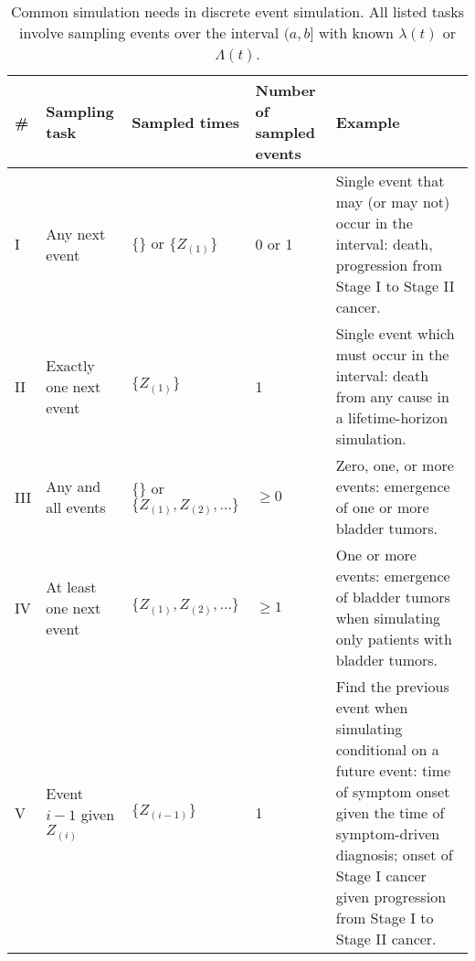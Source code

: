 \begin{table}[ht!]
    \centering
    \begin{tabular}{lp{2cm}lp{1.8cm}p{6cm}}
    \toprule
    \textbf{\#} & \textbf{Sampling task} & \textbf{Sampled times} & \textbf{Number of sampled events} & \textbf{Example}  \\ 
    \midrule
    I & Any next event&  $\{\}$  or $\{Z_{(1)}\}$&  0 or 1& Single event that may (or may not) occur in the interval: death, progression from Stage I to Stage II cancer. \\ 
    \addlinespace
    II & Exactly one next event&  $\{Z_{(1)} \}$&  1& Single event which must occur in the interval: death from any cause in a lifetime-horizon simulation. \\ 
    \addlinespace
    III & Any and all events&  $\{\}$ or $\{Z_{(1)}, Z_{(2)}, \dots \}$&  $\ge 0$& Zero, one, or more events: emergence of one or more bladder tumors. \\ 
    \addlinespace
    IV & At least one next event&  $\{Z_{(1)} , Z_{(2)}, \dots \}$&  $\ge 1$& One or more events: emergence of bladder tumors when simulating only patients with bladder tumors. \\ 
    \addlinespace
    V & Event $i-1$ given $Z_{(i)}$ & $\{Z_{(i-1)}\}$ & 1 & Find the previous event when simulating conditional on a future event: time of symptom onset given the time of symptom-driven diagnosis; onset of Stage I cancer given progression from Stage I to Stage II cancer. \\ 
    \bottomrule
    \end{tabular}
    \caption{Common simulation needs in discrete event simulation. All listed tasks involve sampling events over the interval $(a, b]$ with known $\lambda(t)$ or $\Lambda(t)$.}
    \label{tab:simtasks}
\end{table}
